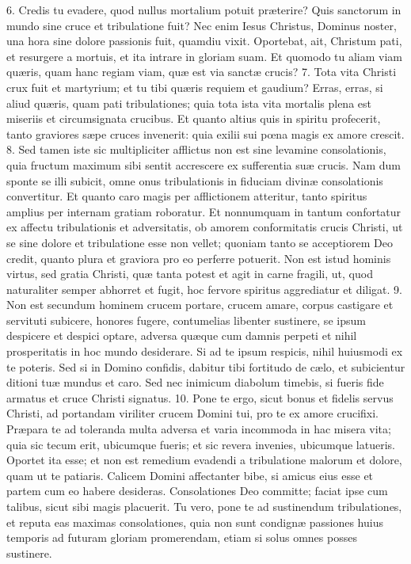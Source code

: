 \documentclass[twoside]{article}
\begin{document}
6. Credis tu evadere, quod nullus mortalium potuit præterire? Quis sanctorum in mundo sine cruce et tribulatione fuit? Nec enim Iesus Christus, Dominus noster, una hora sine dolore passionis fuit, quamdiu vixit. Oportebat, ait, Christum pati, et resurgere a mortuis, et ita intrare in gloriam suam. Et quomodo tu aliam viam quæris, quam hanc regiam viam, quæ est via sanctæ crucis?
7. Tota vita Christi crux fuit et martyrium; et tu tibi quæris requiem et gaudium? Erras, erras, si aliud quæris, quam pati tribulationes; quia tota ista vita mortalis plena est miseriis et circumsignata crucibus. Et quanto altius quis in spiritu profecerit, tanto graviores sæpe cruces invenerit: quia exilii sui pœna magis ex amore crescit.
8. Sed tamen iste sic multipliciter afflictus non est sine levamine consolationis, quia fructum maximum sibi sentit accrescere ex sufferentia suæ crucis. Nam dum sponte se illi subicit, omne onus tribulationis in fiduciam divinæ consolationis convertitur. Et quanto caro magis per afflictionem atteritur, tanto spiritus amplius per internam gratiam roboratur. Et nonnumquam in tantum confortatur ex affectu tribulationis et adversitatis, ob amorem conformitatis crucis Christi, ut se sine dolore et tribulatione esse non vellet; quoniam tanto se acceptiorem Deo credit, quanto plura et graviora pro eo perferre potuerit. Non est istud hominis virtus, sed gratia Christi, quæ tanta potest et agit in carne fragili, ut, quod naturaliter semper abhorret et fugit, hoc fervore spiritus aggrediatur et diligat.
9. Non est secundum hominem crucem portare, crucem amare, corpus castigare et servituti subicere, honores fugere, contumelias libenter sustinere, se ipsum despicere et despici optare, adversa quæque cum damnis perpeti et nihil prosperitatis in hoc mundo desiderare. Si ad te ipsum respicis, nihil huiusmodi ex te poteris. Sed si in Domino confidis, dabitur tibi fortitudo de cælo, et subicientur ditioni tuæ mundus et caro. Sed nec inimicum diabolum timebis, si fueris fide armatus et cruce Christi signatus.
10. Pone te ergo, sicut bonus et fidelis servus Christi, ad portandam viriliter crucem Domini tui, pro te ex amore crucifixi. Præpara te ad toleranda multa adversa et varia incommoda in hac misera vita; quia sic tecum erit, ubicumque fueris; et sic revera invenies, ubicumque latueris. Oportet ita esse; et non est remedium evadendi a tribulatione malorum et dolore, quam ut te patiaris. Calicem Domini affectanter bibe, si amicus eius esse et partem cum eo habere desideras. Consolationes Deo committe; faciat ipse cum talibus, sicut sibi magis placuerit. Tu vero, pone te ad sustinendum tribulationes, et reputa eas maximas consolationes, quia non sunt condignæ passiones huius temporis ad futuram gloriam promerendam, etiam si solus omnes posses sustinere.
\end{document}
